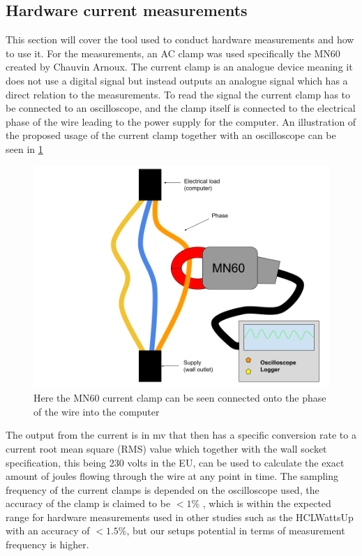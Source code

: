 \subsection{Hardware current measurements} \label{sec:clampIntro}
This section will cover the tool used to conduct hardware measurements and how to use it. For the measurements, an AC clamp was used specifically the MN60 created by Chauvin Arnoux. The current clamp is an analogue device meaning it does not use a digital signal but instead outputs an analogue signal which has a direct relation to the measurements. To read the signal the current clamp has to be connected to an oscilloscope, and the clamp itself is connected to the electrical phase of the wire leading to the power supply for the computer. An illustration of the proposed usage of the current clamp together with an oscilloscope can be seen in \cref{fig:clampSetup}
\begin{figure}[h!]
    \centering
    \includegraphics*[scale=0.4]{figures/CLAMP.png}
    \caption{Here the MN60 current clamp can be seen connected onto the phase of the wire into the computer}
    \label{fig:clampSetup}
\end{figure}
The output from the current is in mv that then has a specific conversion rate to a current root mean square (RMS) value which together with the wall socket specification, this being 230 volts in the EU, can be used to calculate the exact amount of joules flowing through the wire at any point in time. The sampling frequency of the current clamps is depended on the oscilloscope used, the accuracy of the clamp is claimed to be $<1\%$ \cite{ClampDoc}, which is within the expected range for hardware measurements used in other studies such as the HCLWattsUp with an accuracy of $<1.5\%$, but our setups potential in terms of measurement frequency is higher.